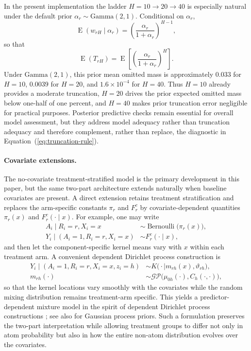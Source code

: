 \documentclass[11pt]{article}
\DeclareMathOperator*{\E}{E}
\DeclareMathOperator*{\Bernoulli}{Bernoulli}
\begin{document}
In the present implementation the ladder $H = 10 \rightarrow 20 \rightarrow 40$ is especially natural under the default prior $\alpha_r \sim \mathrm{Gamma}(2,1)$. Conditional on $\alpha_r$,
\[
  \E(w_{rH} \mid \alpha_r)
  =
  \left(\frac{\alpha_r}{1+\alpha_r}\right)^{H-1},
\]
so that
\[
  \E(T_{rH})
  =
  \E\!\left[
    \left(\frac{\alpha_r}{1+\alpha_r}\right)^H
  \right].
\]
Under $\mathrm{Gamma}(2,1)$, this prior mean omitted mass is approximately $0.033$ for $H=10$, $0.0039$ for $H=20$, and $1.6 \times 10^{-4}$ for $H=40$. Thus $H=10$ already provides a moderate truncation, $H=20$ drives the prior expected omitted mass below one-half of one percent, and $H=40$ makes prior truncation error negligible for practical purposes. Posterior predictive checks remain essential for overall model assessment, but they address model adequacy rather than truncation adequacy and therefore complement, rather than replace, the diagnostic in Equation~(\ref{eq:truncation-rule}).

\paragraph{Covariate extensions.}
The no-covariate treatment-stratified model is the primary development in this paper, but the same two-part architecture extends naturally when baseline covariates are present. A direct extension retains treatment stratification and replaces the arm-specific constants $\pi_r$ and $F_r^c$ by covariate-dependent quantities $\pi_r(x)$ and $F_r^c(\cdot \mid x)$. For example, one may write
\begin{align*}
  A_i \mid R_i = r, X_i = x
  &\sim \Bernoulli\!\bigl(\pi_r(x)\bigr),\\
  Y_i \mid (A_i = 1, R_i = r, X_i = x)
  &\sim F_r^c(\cdot \mid x),
\end{align*}
and then let the component-specific kernel means vary with $x$ within each treatment arm. A convenient dependent Dirichlet process construction is
\begin{align*}
  Y_i \mid (A_i = 1, R_i = r, X_i = x, z_i = h)
  &\sim K\!\bigl(\cdot \mid m_{rh}(x),\vartheta_{rh}\bigr),\\
  m_{rh}(\cdot)
  &\sim \mathcal{GP}\!\bigl(\mu_{0h}(\cdot), C_h(\cdot,\cdot)\bigr),
\end{align*}
so that the kernel locations vary smoothly with the covariates while the random mixing distribution remains treatment-arm specific. This yields a predictor-dependent mixture model in the spirit of dependent Dirichlet process constructions \citep{maceachern1999dependent,gelfand2005bayesian}; see also \citet{rasmussen2006gaussian} for Gaussian process priors. Such a formulation preserves the two-part interpretation while allowing treatment groups to differ not only in atom probability but also in how the entire non-atom distribution evolves over the covariates.
\end{document}
